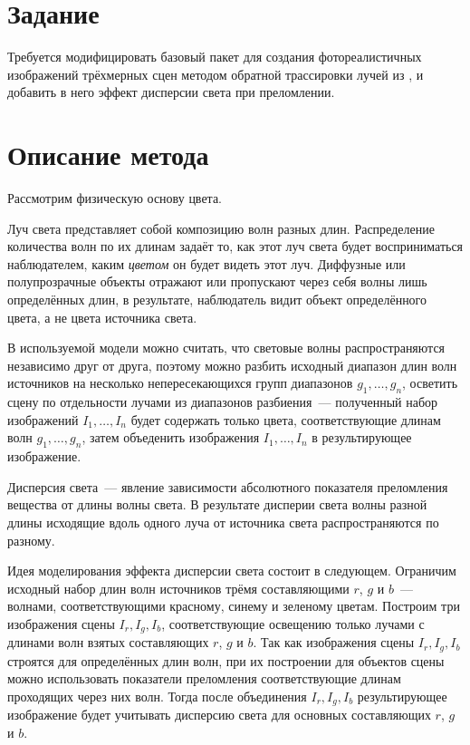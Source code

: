 \documentclass[a4paper,10pt]{article}
\begin{document}




\section{Задание}
Требуется модифицировать базовый пакет для создания фотореалистичных изображений трёхмерных сцен 
методом обратной трассировки лучей из \cite{shikin1995cg},
и добавить в него эффект дисперсии света при преломлении.

\section{Описание метода}
Рассмотрим физическую основу цвета.

Луч света представляет собой композицию волн разных длин.
Распределение количества волн по их длинам задаёт то, 
как этот луч света будет восприниматься наблюдателем, 
каким \textit{цветом} он будет видеть этот луч.
Диффузные или полупрозрачные объекты отражают или пропускают через себя волны лишь определённых длин,
в результате, наблюдатель видит объект определённого цвета, а не цвета источника света.

В используемой модели можно считать, 
что световые волны распространяются независимо друг от друга, 
поэтому можно разбить исходный диапазон длин волн источников 
на несколько непересекающихся групп диапазонов $g_1, \ldots, g_n$, 
осветить сцену по отдельности лучами из диапазонов разбиения~--- 
полученный набор изображений $I_1, \ldots, I_n$ будет содержать только цвета, 
соответствующие длинам волн $g_1, \ldots, g_n$, 
затем объеденить изображения $I_1, \ldots, I_n$ в результирующее изображение.

Дисперсия света~--- явление зависимости абсолютного показателя преломления вещества от длины волны света.
В результате дисперии света волны разной длины исходящие вдоль одного луча от источника света 
распространяются по разному.

Идея моделирования эффекта дисперсии света состоит в следующем.
Ограничим исходный набор длин волн источников трёмя составляющими $r$, $g$ и $b$~---
волнами, соответствующими красному, синему и зеленому цветам.
Построим три изображения сцены $I_r, I_g, I_b$, соответствующие
освещению только лучами с длинами волн взятых составляющих $r$, $g$ и $b$.
Так как изображения сцены $I_r, I_g, I_b$ строятся для определённых длин волн, 
при их построении для объектов сцены можно использовать показатели преломления соответствующие длинам
проходящих через них волн.
Тогда после объединения $I_r, I_g, I_b$ результирующее изображение будет учитывать дисперсию света для
основных составляющих $r$, $g$ и $b$.
\end{document}
